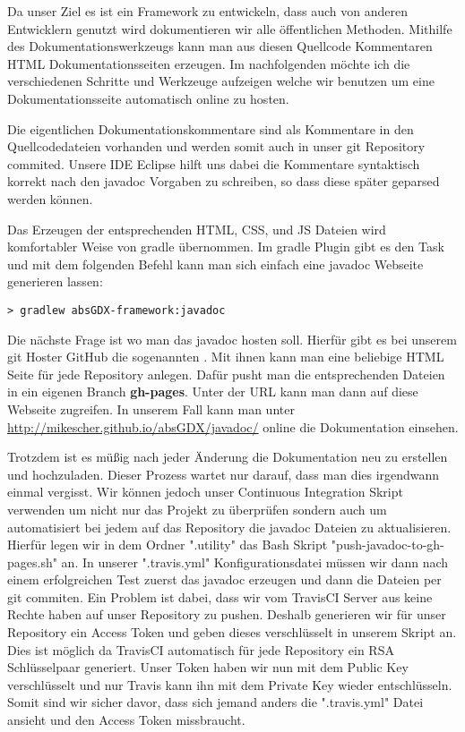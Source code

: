 
Da unser Ziel es ist ein Framework zu entwickeln, dass auch von anderen Entwicklern genutzt wird dokumentieren wir alle öffentlichen Methoden. Mithilfe des Dokumentationswerkzeugs  kann man aus diesen Quellcode Kommentaren HTML Dokumentationsseiten erzeugen. Im nachfolgenden möchte ich die verschiedenen Schritte und Werkzeuge aufzeigen welche wir benutzen um eine Dokumentationsseite automatisch online zu hosten.

Die eigentlichen Dokumentationskommentare sind als Kommentare in den Quellcodedateien vorhanden und werden somit auch in unser git Repository commited. Unsere IDE Eclipse hilft uns dabei die Kommentare syntaktisch korrekt nach den javadoc Vorgaben zu schreiben, so dass diese später geparsed werden können.

Das Erzeugen der entsprechenden HTML, CSS, und JS Dateien wird komfortabler Weise von gradle übernommen. Im gradle Plugin  gibt es den Task  und mit dem folgenden Befehl kann man sich einfach eine javadoc Webseite generieren lassen: 

\doinlineII
\begin{lstlisting}[caption=Gradle in der Kommandozeile, title=\hspace{0 pt}, style=cmd]
> gradlew absGDX-framework:javadoc
\end{lstlisting}

Die nächste Frage ist wo man das javadoc hosten soll. Hierfür gibt es bei unserem git Hoster GitHub die sogenannten . Mit ihnen kann man eine beliebige HTML Seite für jede Repository anlegen. Dafür pusht man die entsprechenden Dateien in ein eigenen Branch \textbf{gh-pages}. Unter der URL  kann man dann auf diese Webseite zugreifen. In unserem Fall kann man unter \href{http://mikescher.github.io/absGDX/javadoc/}{http://mikescher.github.io/absGDX/javadoc/} online die Dokumentation einsehen.

Trotzdem ist es müßig nach jeder Änderung die Dokumentation neu zu erstellen und hochzuladen. Dieser Prozess wartet nur darauf, dass man dies irgendwann einmal vergisst.
Wir können jedoch unser Continuous Integration Skript verwenden um nicht nur das Projekt zu überprüfen sondern auch um automatisiert bei jedem  auf das Repository die javadoc Dateien zu aktualisieren.
Hierfür legen wir in dem Ordner ".utility" das Bash Skript "push-javadoc-to-gh-pages.sh" an. In unserer ".travis.yml" Konfigurationsdatei müssen wir dann nach einem erfolgreichen Test zuerst das javadoc erzeugen und dann die Dateien per git commiten. Ein Problem ist dabei, dass wir vom TravisCI Server aus keine Rechte haben auf unser Repository zu pushen. Deshalb generieren wir für unser Repository ein Access Token und geben dieses verschlüsselt in unserem Skript an. Dies ist möglich da TravisCI automatisch für jede Repository ein RSA Schlüsselpaar generiert. Unser Token haben wir nun mit dem Public Key verschlüsselt und nur Travis kann ihn mit dem Private Key wieder entschlüsseln. Somit sind wir sicher davor, dass sich jemand anders die  ".travis.yml" Datei ansieht und den Access Token missbraucht.

